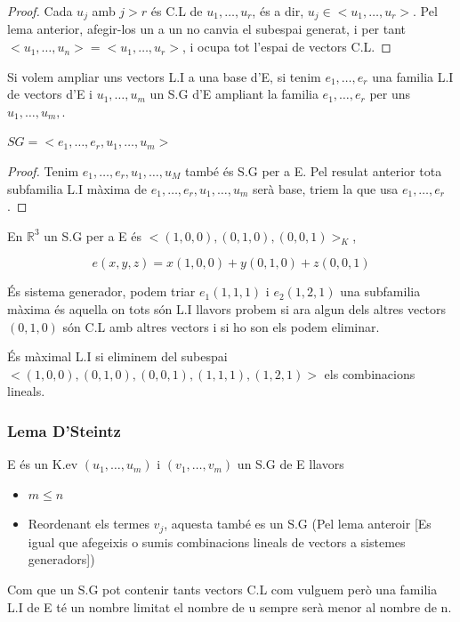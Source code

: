 \documentclass[12pt]{article}
\newcommand{\R}{\mathbb{R}}
\begin{document}
\begin{proof}
    Cada $u_j$ amb $j>r$ és C.L de $u_1,\dots,u_r$, és a dir, $u_j \in <u_1,\dots,u_r>$.
    Pel lema anterior, afegir-los un a un no canvia el subespai generat, i per tant
    $<u_1,\dots,u_n> = <u_1,\dots,u_r>$, i ocupa tot l'espai de vectors C.L.
\end{proof}

Si volem ampliar uns vectors L.I a una base d'E, si tenim $e_1,\dots,e_r$ una familia L.I de vectors d'E i $u_1,\dots,u_m$ un S.G d'E ampliant la familia $e_1,\dots,e_r$ per uns $u_1, \dots, u_m,$.

$SG = <e_1, \dots, e_r, u_1, \dots, u_m>$

\begin{proof}
    Tenim $e_1, \dots, e_r, u_1, \dots, u_M$ també és S.G per a E. Pel resulat anterior tota subfamilia L.I màxima de $e_1, \dots, e_r, u_1, \dots, u_m$ serà base, triem la que usa $e_1, \dots, e_r$.
\end{proof}

\begin{examplebox}{}
    En $\R^3$ un S.G per a E és $<(1,0,0), (0,1,0), (0,0,1)>_K$,

    \[e(x,y,z) = x(1,0,0) + y(0,1,0) + z(0,0,1)\] 
    
    És sistema generador, podem triar $e_1(1,1,1)$ i $e_2(1,2,1)$ una subfamilia màxima és aquella on tots són L.I llavors probem si ara algun dels altres vectors $(0,1,0)$ són C.L amb altres vectors i si ho son els podem eliminar.

    És màximal L.I si eliminem del subespai $<(1,0,0), (0,1,0), (0,0,1), (1,1,1), (1,2,1)>$ els combinacions lineals.
\end{examplebox}

\subsubsection{Lema D'Steintz}

E és un K.ev $(u_1, \dots, u_m)$ i $(v_1,\dots, v_m)$ un S.G de E llavors
\begin{itemize}
    \item $m\leq n$
    \item Reordenant els termes $v_j$, aquesta també es un S.G (Pel lema anteroir [Es igual que afegeixis o sumis combinacions lineals de vectors a sistemes generadors])
\end{itemize}

Com que un S.G pot contenir tants vectors C.L com vulguem però una familia L.I de E té un nombre limitat el nombre de u sempre serà menor al nombre de n.
\end{document}

